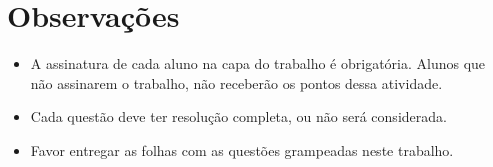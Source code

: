 \documentclass[a4paper]{article}
\begin{document}
\section{Observações}

\begin{itemize}
\item A assinatura de cada aluno na capa do trabalho é
  obrigatória. Alunos que não assinarem o trabalho, não receberão os
  pontos dessa atividade.
\item Cada questão deve ter resolução completa, ou não será
  considerada.
\item Favor entregar as folhas com as questões grampeadas neste
  trabalho.
\end{itemize}
\end{document}
